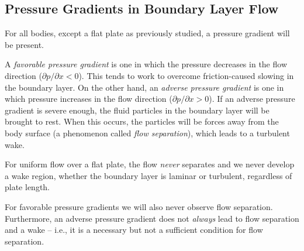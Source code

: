 \subsection{Pressure Gradients in Boundary Layer Flow}
For all bodies, except a flat plate as previously studied, a pressure gradient will be present.

A \textit{favorable pressure gradient} is one in which the pressure decreases in the flow direction ($\partial p / \partial x < 0$).
This tends to work to overcome friction-caused slowing in the boundary layer.
On the other hand, an \textit{adverse pressure gradient} is one in which pressure increases in the flow direction ($\partial p / \partial x > 0$). 
If an adverse pressure gradient is severe enough, the fluid particles in the boundary layer will be brought to rest.
When this occurs, the particles will be forces away from the body surface (a phenomenon called \textit{flow separation}), which leads to a turbulent wake.

For uniform flow over a flat plate, the flow \textit{never} separates and we never develop a wake region, whether the boundary layer is laminar or turbulent, regardless of plate length.

For favorable pressure gradients we will also never observe flow separation.
Furthermore, an adverse pressure gradient does not \textit{always} lead to flow separation and a wake -- i.e., it is a necessary but not a sufficient condition for flow separation.

